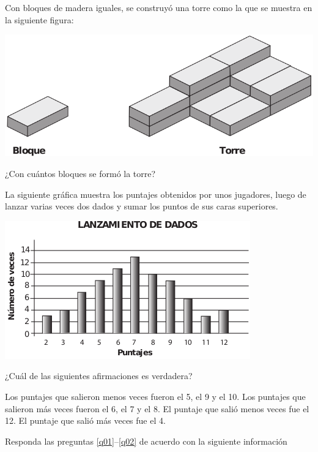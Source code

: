 \documentclass[10pt,addpoints]{exam}
\begin{document}
\begin{multicols}{2}
\begin{questions}
\question Con bloques de madera iguales, se construyó una torre como la que se muestra en la siguiente figura:
\begin{center}
\includegraphics[scale=.2]{Images/Pantallazo-15.png} 
\end{center}
¿Con cuántos bloques se formó la torre?

\begin{oneparchoices}
\end{oneparchoices}
\question
La siguiente gráfica muestra los puntajes obtenidos por unos jugadores, luego de lanzar varias veces dos dados y sumar los puntos de sus caras superiores.
\begin{center}
\includegraphics[scale=.4]{Images/Pantallazo-16.png} 
\end{center}
¿Cuál de las siguientes afirmaciones es verdadera?
\begin{choices}
\choice Los puntajes que salieron menos veces fueron el 5, el 9 y el 10.
\CorrectChoice Los puntajes que salieron más veces fueron el 6, el 7 y el 8.
\choice El puntaje que salió menos veces fue el 12.
\choice El puntaje que salió más veces fue el 4.
\end{choices}
Responda las preguntas \ref{q01}--\ref{q02} de acuerdo con la siguiente información


\end{questions}
\end{multicols}
\end{document}
